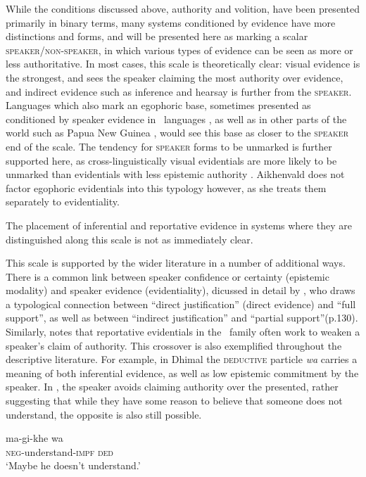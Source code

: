 While the conditions discussed above, authority and volition, have been presented primarily in binary terms, many systems conditioned by evidence have more distinctions and forms, and will be presented here as marking a scalar \textsc{speaker}/\textsc{non-speaker}, in which various types of evidence can be seen as more or less authoritative. In most cases, this scale is theoretically clear: visual evidence is the strongest, and sees the speaker claiming the most authority over evidence, and indirect evidence such as inference and hearsay is further from the \textsc{speaker}. Languages which also mark an egophoric base, sometimes presented as conditioned by speaker evidence in \lfam\ languages \cite{Hill2017}, as well as in other parts of the world such as Papua New Guinea \cite{SanRoque2012}, would see this base as closer to the \textsc{speaker} end of the scale. The tendency for \textsc{speaker} forms to be unmarked is further supported here, as cross-linguistically visual evidentials are more likely to be unmarked than evidentials with less epistemic authority \cite[73]{Aikhenvald2004}. Aikhenvald does not factor egophoric evidentials into this typology however, as she treats them separately to evidentiality.

The placement of inferential and reportative evidence in systems where they are distinguished along this scale is not as immediately clear. 

This scale is supported by the wider literature in a number of additional ways. There is a common link between speaker confidence or certainty (epistemic modality) and speaker evidence (evidentiality), dicussed in detail by , who draws a typological connection between ``direct justification'' (direct evidence) and ``full support'', as well as between ``indirect justification'' and ``partial support''(p.130). Similarly,  notes that reportative evidentials in the \lfam\ family often work to weaken a speaker's claim of authority. This crossover is also exemplified throughout the descriptive literature. For example, in Dhimal \cite[Dhimalish: India,][245]{King2009} the \textsc{deductive} particle \textit{wa} carries a meaning of both inferential evidence, as well as low epistemic commitment by the speaker. In , the speaker avoids claiming authority over the presented, rather suggesting that while they have some reason to believe that someone does not understand, the opposite is also still possible.

\begin{exe}
        \ex\label{e:Description:DhimalDeductive}
        \gll ma-gi-khe wa \\
        \textsc{neg}-understand-\textsc{impf} \textsc{ded} \\
        \glt `Maybe he doesn't understand.' \cite[Dhimal,][245]{King2009}
\end{exe}

